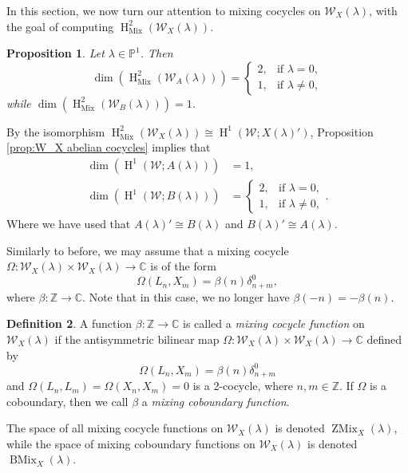 \documentclass[11pt, svgnames]{amsart}
\newcommand{\ZZ}{\mathbb{Z}}
\newcommand{\CC}{\mathbb{C}}
\newcommand{\PP}{\mathbb{P}}
\newcommand{\W}{\mathcal{W}}
\DeclareMathOperator{\HH}{H}
\DeclareMathOperator{\Mix}{Mix}
\DeclareMathOperator{\ZMix}{ZMix}
\DeclareMathOperator{\BMix}{BMix}
\newtheorem{proposition}{Proposition}[section]
\theoremstyle{definition}
\newtheorem{defn}[proposition]{Definition}
\begin{document}
In this section, we now turn our attention to mixing cocycles on $\W_X(\lambda)$, with the goal of computing $\HH_{\Mix}^2(\W_X(\lambda))$.

\begin{proposition}\label{prop:W_X mixing cocycles}
    Let $\lambda \in \PP^1$. Then
    $$\dim(\HH_{\Mix}^2(\W_A(\lambda))) = \begin{cases}
        2, &\text{if } \lambda = 0,\\
        1, &\text{if } \lambda \neq 0,
    \end{cases}$$
    while $\dim(\HH_{\Mix}^2(\W_B(\lambda))) = 1$.
\end{proposition}

By the isomorphism $\HH^2_{\Mix}(\W_X(\lambda)) \cong \HH^1(\W;X(\lambda)')$, Proposition \ref{prop:W_X abelian cocycles} implies that
\begin{align*}
    \dim(\HH^1(\W;A(\lambda))) &= 1, \\
    \dim(\HH^1(\W;B(\lambda))) &= \begin{cases}
        2, &\text{if } \lambda = 0, \\
        1, &\text{if } \lambda \neq 0,
    \end{cases}.
\end{align*}
Where we have used that $A(\lambda)' \cong B(\lambda)$ and $B(\lambda)' \cong A(\lambda)$.

Similarly to before, we may assume that a mixing cocycle $\Omega \colon \W_X(\lambda) \times \W_X(\lambda) \to \CC$ is of the form
\begin{equation}
    \Omega(L_n,X_m) = \beta(n)\delta_{n+m}^0,
\end{equation}
where $\beta \colon \ZZ \to \CC$. Note that in this case, we no longer have $\beta(-n) = -\beta(n)$.

\begin{defn}
    A function $\beta \colon \ZZ \to \CC$ is called a \emph{mixing cocycle function} on $\W_X(\lambda)$ if the antisymmetric bilinear map $\Omega \colon \W_X(\lambda) \times \W_X(\lambda) \to \CC$ defined by
    $$\Omega(L_n,X_m) = \beta(n)\delta_{n+m}^0$$
    and $\Omega(L_n,L_m) = \Omega(X_n,X_m) = 0$ is a 2-cocycle, where $n,m \in \ZZ$. If $\Omega$ is a coboundary, then we call $\beta$ a \emph{mixing coboundary function}.
    
    The space of all mixing cocycle functions on $\W_X(\lambda)$ is denoted $\ZMix_X(\lambda)$, while the space of mixing coboundary functions on $\W_X(\lambda)$ is denoted $\BMix_X(\lambda)$.
\end{defn}
\end{document}
